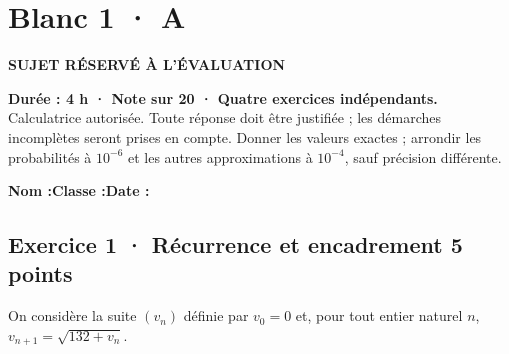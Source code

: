 \fi

\ifprof

\clearpage{}\label{sujet:5-3}

\section*{Blanc 1 · A}

{\sffamily\bfseries\color{amber}SUJET RÉSERVÉ À L'ÉVALUATION\par}

\textbf{Durée : 4 h · Note sur 20 · Quatre exercices indépendants.}\\Calculatrice autorisée. Toute réponse doit être justifiée ; les démarches incomplètes seront prises en compte. Donner les valeurs exactes ; arrondir les probabilités à $10^{-6}$ et les autres approximations à $10^{-4}$, sauf précision différente.

\smallskip\textbf{Nom :}\enspace\dotfill\quad\textbf{Classe :}\enspace\dotfill\quad\textbf{Date :}\enspace\dotfill

\subsection*{Exercice 1 · Récurrence et encadrement \hfill 5 points}On considère la suite $(v_n)$ définie par $v_0=0$ et, pour tout entier naturel $n$, $v_{n+1}=\sqrt{132+v_n}$.

